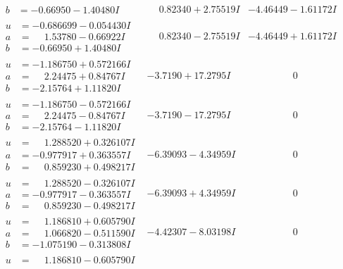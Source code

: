 \documentclass[1p]{elsarticle_modified}
\theoremstyle{definition}
\begin{document}
$$\begin{array}{c|c|c}
\begin{aligned}
b &= -0.66950 - 1.40480 I\end{aligned}
 & \phantom{-}0.82340 + 2.75519 I & -4.46449 - 1.61172 I \\ \hline\begin{aligned}
u &= -0.686699 - 0.054430 I \\
a &= \phantom{-}1.53780 - 0.66922 I \\
b &= -0.66950 + 1.40480 I\end{aligned}
 & \phantom{-}0.82340 - 2.75519 I & -4.46449 + 1.61172 I \\ \hline\begin{aligned}
u &= -1.186750 + 0.572166 I \\
a &= \phantom{-}2.24475 + 0.84767 I \\
b &= -2.15764 + 1.11820 I\end{aligned}
 & -3.7190 + 17.2795 I & \phantom{-0.000000 } 0 \\ \hline\begin{aligned}
u &= -1.186750 - 0.572166 I \\
a &= \phantom{-}2.24475 - 0.84767 I \\
b &= -2.15764 - 1.11820 I\end{aligned}
 & -3.7190 - 17.2795 I & \phantom{-0.000000 } 0 \\ \hline\begin{aligned}
u &= \phantom{-}1.288520 + 0.326107 I \\
a &= -0.977917 + 0.363557 I \\
b &= \phantom{-}0.859230 + 0.498217 I\end{aligned}
 & -6.39093 - 4.34959 I & \phantom{-0.000000 } 0 \\ \hline\begin{aligned}
u &= \phantom{-}1.288520 - 0.326107 I \\
a &= -0.977917 - 0.363557 I \\
b &= \phantom{-}0.859230 - 0.498217 I\end{aligned}
 & -6.39093 + 4.34959 I & \phantom{-0.000000 } 0 \\ \hline\begin{aligned}
u &= \phantom{-}1.186810 + 0.605790 I \\
a &= \phantom{-}1.066820 - 0.511590 I \\
b &= -1.075190 - 0.313808 I\end{aligned}
 & -4.42307 - 8.03198 I & \phantom{-0.000000 } 0 \\ \hline\begin{aligned}
u &= \phantom{-}1.186810 - 0.605790 I \\

\end{aligned}
\end{array}$$
\end{document}

